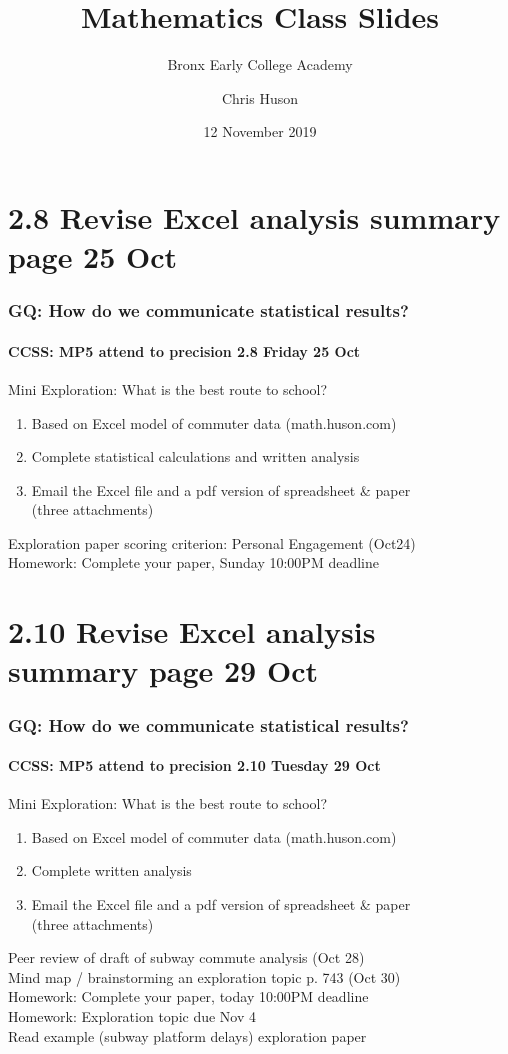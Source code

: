 \documentclass{beamer}
\title{Mathematics Class Slides}
\subtitle{Bronx Early College Academy}
\author{Chris Huson}
\date{12 November 2019}
\begin{document}
\frame{\titlepage}
\section[Outline]{}
\frame{\tableofcontents}


\section{2.8 Revise Excel analysis summary page 25 Oct}
\frame
{
  \frametitle{GQ: How do we communicate statistical results?}
  \framesubtitle{CCSS: MP5 attend to precision \hfill \alert{2.8 Friday 25 Oct}}

  \begin{block}{Mini Exploration: What is the best route to school?}
    \begin{enumerate}
      \item Based on Excel model of commuter data (math.huson.com)
      \item Complete statistical calculations and written analysis
      \item Email the Excel file and a pdf version of spreadsheet \& paper\\
      (three attachments)
  \end{enumerate}
  \end{block}
  Exploration paper scoring criterion: Personal Engagement (Oct24) \\
  Homework: Complete your paper, Sunday 10:00PM deadline
}


\section{2.10 Revise Excel analysis summary page 29 Oct}
\frame
{
  \frametitle{GQ: How do we communicate statistical results?}
  \framesubtitle{CCSS: MP5 attend to precision \hfill \alert{2.10 Tuesday 29 Oct}}

  \begin{block}{Mini Exploration: What is the best route to school?}
    \begin{enumerate}
      \item Based on Excel model of commuter data (math.huson.com)
      \item Complete written analysis
      \item Email the Excel file and a pdf version of spreadsheet \& paper\\
      (three attachments)
  \end{enumerate}
  \end{block}
  Peer review of draft of subway commute analysis (Oct 28) \\
  Mind map / brainstorming an exploration topic p. 743 (Oct 30)\\
  Homework: Complete your paper, today 10:00PM deadline \\
  Homework: Exploration topic due Nov 4 \\
  Read example (subway platform delays) exploration paper
  }
\end{document}
